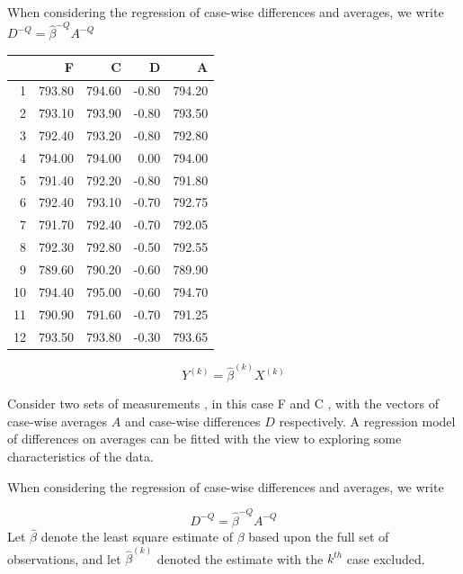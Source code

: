 \documentclass[12pt, a4paper]{report}
\theoremstyle{plain}
\theoremstyle{definition}
\theoremstyle{remark}
\begin{document}
	When considering the regression of case-wise differences and averages, we write $D^{-Q} = \hat{\beta}^{-Q}A^{-Q}$
	
	
	
	
	\begin{table}[ht]
		\begin{center}
			\begin{tabular}{rrrrr}
				\hline
				& F & C & D & A \\
				\hline
				1 & 793.80 & 794.60 & -0.80 & 794.20 \\
				2 & 793.10 & 793.90 & -0.80 & 793.50 \\
				3 & 792.40 & 793.20 & -0.80 & 792.80 \\
				4 & 794.00 & 794.00 & 0.00 & 794.00 \\
				5 & 791.40 & 792.20 & -0.80 & 791.80 \\
				6 & 792.40 & 793.10 & -0.70 & 792.75 \\
				7 & 791.70 & 792.40 & -0.70 & 792.05 \\
				8 & 792.30 & 792.80 & -0.50 & 792.55 \\
				9 & 789.60 & 790.20 & -0.60 & 789.90 \\
				10 & 794.40 & 795.00 & -0.60 & 794.70 \\
				11 & 790.90 & 791.60 & -0.70 & 791.25 \\
				12 & 793.50 & 793.80 & -0.30 & 793.65 \\
				\hline
			\end{tabular}
		\end{center}
	\end{table}
	
	\begin{equation}
	Y^{(k)} = \hat{\beta}^{(k)}X^{(k)}
	\end{equation}
	
	Consider two sets of measurements , in this case F and C , with the vectors of case-wise averages $A$ and case-wise differences $D$ respectively. A regression model of differences on averages can be fitted with the view to exploring some characteristics of the data.
	
	When considering the regression of case-wise differences and averages, we write
	
	\begin{equation}
	D^{-Q} = \hat{\beta}^{-Q}A^{-Q}
	\end{equation}
	Let $\hat{\beta}$ denote the least square estimate of $\beta$ based upon the full set of observations, and let $\hat{\beta}^{(k)}$ denoted the estimate with the $k^{th}$ case excluded.
	
\end{document}
